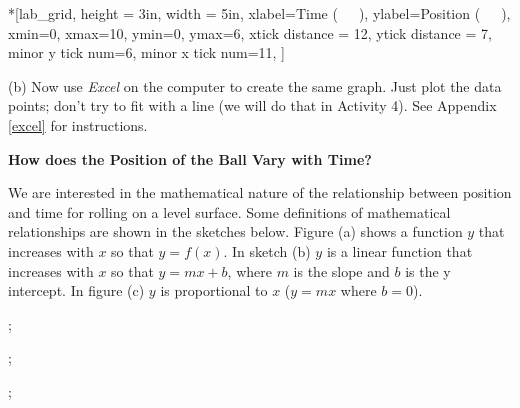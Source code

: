 \begin{lab_axis}*[lab_grid,
	height = {3in},
	width = {5in},
	xlabel={Time (~~~)},
	ylabel={Position (~~~)},
	xmin=0, xmax=10,
	ymin=0, ymax=6,
	xtick distance = 12,
	ytick distance = 7,
	minor y tick num=6,
	minor x tick num=11,
	]
\end{lab_axis}

(b) Now use \textit{Excel} on the computer to create the same graph. Just plot the 
data points; don't try to fit with a line (we will do that in Activity 4). 
See Appendix \ref{excel} for instructions.

\textbf{How does the Position of the Ball Vary with Time?} 

We are interested in the mathematical nature of the relationship between position
and time for rolling on a level surface. Some definitions of mathematical relationships
are shown in the sketches below. Figure (a) shows a function $y$ that increases
with $x$ so that $y = f(x)$. 
In sketch (b) $y$ is a linear function that increases
with $x$ so that $y = mx + b$, where 
$m$ is the slope and $b$ is the y intercept. In
figure (c) $y$ is proportional to $x$ ($y = mx$ where $b = 0$).

\begin{center}
\begin{lab_axis}[lab_noticks_4quads,
	scale only axis=true,
	height = {1.8in}, width = {1.8in},
	xlabel={$x$},
	ylabel={$y$},
	title={(a)},
	]
;
\end{lab_axis}
\begin{lab_axis}[lab_noticks_4quads,
	scale only axis=true,
	height = {1.8in}, width = {1.8in},
	xlabel={$x$},
	ylabel={$y$},
	title={(b)},
	]
;
\end{lab_axis}
\begin{lab_axis}[lab_noticks_4quads,
	scale only axis=true,
	height = {1.8in}, width = {1.8in},
	xlabel={$x$},
	ylabel={$y$},
	title={(c)},
	]
;
\end{lab_axis}
\end{center}


